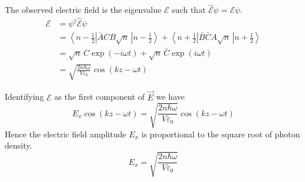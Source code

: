 \documentclass[12pt]{article}
\begin{document}
\noindent
The observed electric field is the eigenvalue $\mathscr{E}$ such that $\hat{\mathscr{E}}\psi=\mathscr{E}\psi$.
\begin{align*}
\mathscr{E}
&=\psi^\dagger\hat{\mathscr{E}}\psi\\
&=\left\langle n-\tfrac{1}{2}\right|\bar{A}CB\sqrt{n}\,\left|n-\tfrac{1}{2}\right\rangle
+\left\langle n+\tfrac{1}{2}\right|\bar{B}\bar{C}A\sqrt{n}\,\left|n+\tfrac{1}{2}\right\rangle\\
&=\sqrt{n}\,C\exp(-i\omega t)+\sqrt{n}\,\bar{C}\exp(i\omega t)\\
&=\sqrt{\frac{2n\hbar\omega}{V\varepsilon_0}}\cos(kz-\omega t)
\end{align*}

\noindent
Identifying $\mathscr{E}$ as the first component of $\vec{E}$ we have
$$
E_x\cos(kz-\omega t)=\sqrt{\frac{2n\hbar\omega}{V\varepsilon_0}}\cos(kz-\omega t)
$$
Hence the electric field amplitude $E_x$ is proportional to the square root of photon density.
$$
E_x=\sqrt{\frac{2n\hbar\omega}{V\varepsilon_0}}
$$
\end{document}
